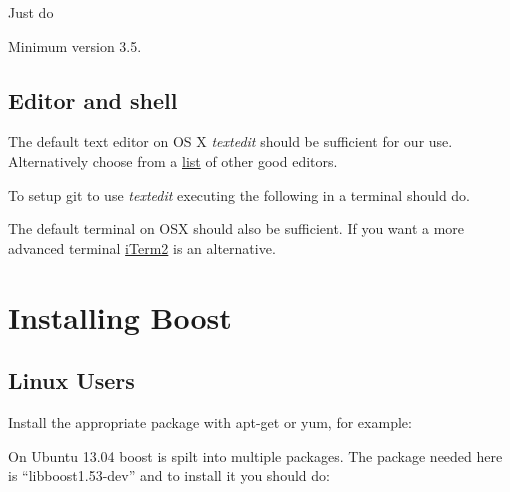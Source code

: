 Just do

\begin{Shaded}
\begin{Highlighting}[]
 
\end{Highlighting}
\end{Shaded}

Minimum version 3.5.

\subsection{Editor and shell}\label{editor-and-shell-1}

The default text editor on OS X \emph{textedit} should be sufficient for
our use. Alternatively choose from a
\href{http://mac.appstorm.net/roundups/office-roundups/top-10-mac-text-editors/}{list}
of other good editors.

To setup git to use \emph{textedit} executing the following in a
terminal should do.

\begin{Shaded}
\begin{Highlighting}[]
 
\end{Highlighting}
\end{Shaded}

The default terminal on OSX should also be sufficient. If you want a
more advanced terminal \href{http://www.iterm2.com/}{iTerm2} is an
alternative.

\section{Installing Boost}\label{installing-boost}

\subsection{Linux Users}\label{linux-users}

Install the appropriate package with apt-get or yum, for example:

\begin{Shaded}
\begin{Highlighting}[]
 
\end{Highlighting}
\end{Shaded}

On Ubuntu 13.04 boost is spilt into multiple packages. The package
needed here is ``libboost1.53-dev'' and to install it you should do:

